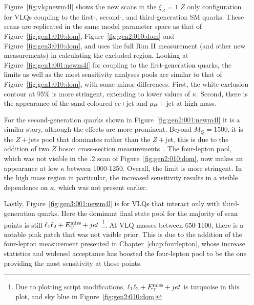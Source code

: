 Figure~\ref{fig:vlq:newm4l} shows the new \contur scans in the $\xi_Z=1$ $Z$ only configuration for VLQs coupling to the first-, second-, and third-generation SM quarks. These scans are replicated in the same model parameter space as that of Figure~\ref{fig:gen1:010:dom}, Figure~\ref{fig:gen2:010:dom} and Figure~\ref{fig:gen3:010:dom}, and uses the \ATLAS full Run II \mFourL{} measurement (and other new measurements) in calculating the excluded region. Looking at Figure~\ref{fig:gen1:001:newm4l} for coupling to the first-generation quarks, the limits as well as the most sensitivity analyses pools are similar to that of Figure~\ref{fig:gen1:010:dom}, with some minor differences. First, the white exclusion contour at 95\% is more stringent, extending to lower values of $\kappa$. Second, there is the appearance of the sand-coloured \CMS $ee$+jet and \CMS $\mu\mu+$jet at high mass. 

For the second-generation quarks shown in Figure~\ref{fig:gen2:001:newm4l} it is a similar story, although the effects are more prominent. Beyond $M_Q=$\unit{1500}{\GeV}, it is the \CMS $Z+$jets pool that dominates rather than the \ATLAS $Z+$jet, this is due to the addition of two \CMS 
$Z$ boson cross-section measurements~\cite{Sirunyan:2019bzr,Sirunyan:2018cpw}. The four-lepton pool, which was not visible in the .2 scan of Figure~\ref{fig:gen2:010:dom}, now makes an appearance at low $\kappa$ between \unit{1000}{\GeV}-\unit{1250}{\GeV}. Overall, the \contur limit is more stringent. In the high mass region in particular, the increased sensitivity results in a visible dependence on $\kappa$, which was not present earlier.

Lastly, Figure~\ref{fig:gen3:001:newm4l} is for VLQs that interact only with third-generation quarks. Here the dominant final state pool for the majority of scan points is still \ATLAS $\ell_1 \ell_2 + E_\mathrm{T}^\mathrm{miss}{} + jet$~\footnote{Due to plotting script modifications, \ATLAS $\ell_1 \ell_2 + E_\mathrm{T}^\mathrm{miss}{} + jet$ is turquoise in this plot, and sky blue in Figure~\ref{fig:gen2:010:dom}}. At VLQ masses between \unit{650}{\GeV}-\unit{1100}{\GeV}, there is a notable pink patch that was not visible prior. This is due to the addition of the four-lepton measurement presented in Chapter~\ref{chap:fourlepton}, whose increase statistics and widened acceptance has boosted the four-lepton pool to be the one providing the most sensitivity at those points. 


